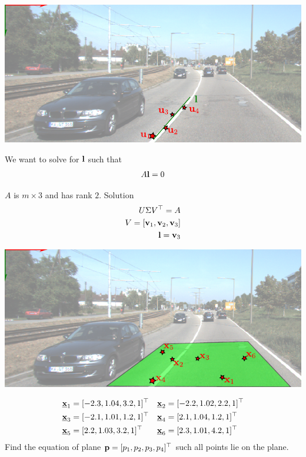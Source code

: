 \documentclass[times,t]{beamer}
\begin{document}
\begin{frame}
  \includegraphics[width=\linewidth]{media/lane-from-points.pdf}

  We want to solve for $\mathbf{l}$ such that
  \begin{align*}
    A \mathbf{l} = 0
  \end{align*}

  $A$ is $m \times 3$ and has rank $2$. Solution
  \begin{align*}
    U \Sigma V^\top = A
    \\
    V = [\mathbf{v}_1, \mathbf{v}_2, \mathbf{v}_3]
    \\
    \mathbf{l} = \mathbf{v}_3
  \end{align*}
\end{frame}
\newcommand{\ubfx}{\underline{\bfx}}
\begin{frame}
  \includegraphics[width=\linewidth]{media/plane-from-points.pdf}

  {\small
  \begin{align*}
  \ubfx_1 &= [-2.3, 1.04, 3.2, 1]^\top & 
  \ubfx_2 &= [-2.2, 1.02, 2.2, 1]^\top\\
  \ubfx_3 &= [-2.1, 1.01, 1.2, 1]^\top & 
  \ubfx_4 &= [2.1, 1.04, 1.2, 1]^\top \\
  \ubfx_5 &= [2.2, 1.03, 3.2, 1]^\top  &
  \ubfx_6 &= [2.3, 1.01, 4.2, 1]^\top
  \end{align*}
  }
  Find the equation of plane $\mathbf{p} = [p_1, p_2, p_3, p_4]^\top$ such  all points
  lie on the plane.
\end{frame}
\end{document}

